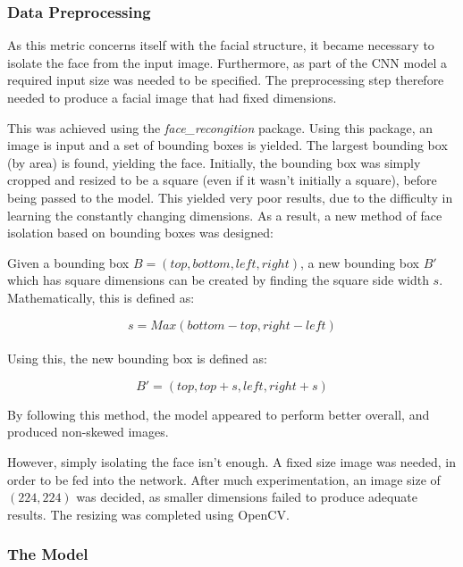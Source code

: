 \documentclass[11pt,a4paper]{article}
\begin{document}
            \subsubsection{Data Preprocessing}
                As this metric concerns itself with the facial structure, it became necessary to isolate the face from the input image. Furthermore, as part of the CNN model a required input size was needed to be specified. 
                The preprocessing step therefore needed to produce a facial image that had fixed dimensions.

                This was achieved using the \emph{face\_recongition} package. Using this package, an image is input and a set of bounding boxes is yielded. The largest bounding box (by area) is found,
                yielding the face. Initially, the bounding box was simply cropped and resized to be a square (even if it wasn't initially a square), before being passed to the model. This yielded very poor results,
                due to the difficulty in learning the constantly changing dimensions. As a result, a new method of face isolation based on bounding boxes was designed:

                Given a bounding box $B = (top, bottom, left, right)$, a new bounding box $B'$ which has square dimensions can be created by finding the square
                side width $s$. Mathematically, this is defined as:

                $$s = Max(bottom - top, right - left)$$\\


                Using this, the new bounding box is defined as:


                $$B' = (top, top + s, left, right + s)$$


                By following this method, the model appeared to perform better overall, and produced non-skewed images.

                However, simply isolating the face isn't enough. A fixed size image was needed, in order to be fed into the network. After much experimentation, an image size of $(224, 224)$
                was decided, as smaller dimensions failed to produce adequate results. The resizing was completed using OpenCV.

                
            \subsubsection{The Model}
                    
\end{document}
